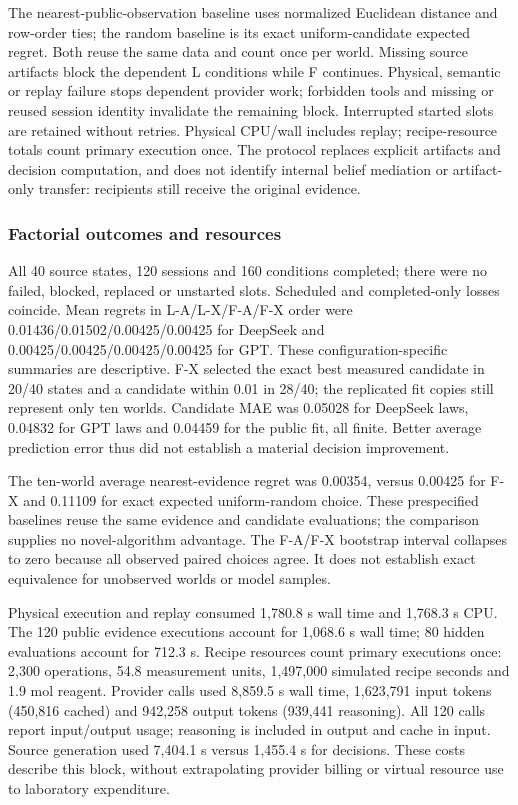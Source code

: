 \documentclass[10pt,twocolumn]{article}
\begin{document}
The nearest-public-observation baseline uses normalized Euclidean
distance and row-order ties; the random baseline is its exact
uniform-candidate expected regret. Both reuse the same data and count
once per world. Missing source artifacts block the dependent L
conditions while F continues. Physical, semantic or replay failure stops
dependent provider work; forbidden tools and missing or reused session
identity invalidate the remaining block. Interrupted started slots are
retained without retries. Physical CPU/wall includes replay;
recipe-resource totals count primary execution once. The protocol
replaces explicit artifacts and decision computation, and does not
identify internal belief mediation or artifact-only transfer: recipients
still receive the original evidence.

\subsubsection{Factorial outcomes and
resources}\label{factorial-outcomes-and-resources}

All 40 source states, 120 sessions and 160 conditions completed; there
were no failed, blocked, replaced or unstarted slots. Scheduled and
completed-only losses coincide. Mean regrets in L-A/L-X/F-A/F-X order
were 0.01436/0.01502/0.00425/0.00425 for DeepSeek and
0.00425/0.00425/0.00425/0.00425 for GPT. These configuration-specific
summaries are descriptive. F-X selected the exact best measured
candidate in 20/40 states and a candidate within 0.01 in 28/40; the
replicated fit copies still represent only ten worlds. Candidate MAE was
0.05028 for DeepSeek laws, 0.04832 for GPT laws and 0.04459 for the
public fit, all finite. Better average prediction error thus did not
establish a material decision improvement.

The ten-world average nearest-evidence regret was 0.00354, versus
0.00425 for F-X and 0.11109 for exact expected uniform-random choice.
These prespecified baselines reuse the same evidence and candidate
evaluations; the comparison supplies no novel-algorithm advantage. The
F-A/F-X bootstrap interval collapses to zero because all observed paired
choices agree. It does not establish exact equivalence for unobserved
worlds or model samples.

Physical execution and replay consumed 1,780.8 s wall time and 1,768.3 s
CPU. The 120 public evidence executions account for 1,068.6 s wall time;
80 hidden evaluations account for 712.3 s. Recipe resources count
primary executions once: 2,300 operations, 54.8 measurement units,
1,497,000 simulated recipe seconds and 1.9 mol reagent. Provider calls
used 8,859.5 s wall time, 1,623,791 input tokens (450,816 cached) and
942,258 output tokens (939,441 reasoning). All 120 calls report
input/output usage; reasoning is included in output and cache in input.
Source generation used 7,404.1 s versus 1,455.4 s for decisions. These
costs describe this block, without extrapolating provider billing or
virtual resource use to laboratory expenditure.
\end{document}
